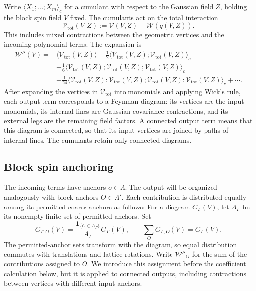 \documentclass[11pt]{article}
\numberwithin{equation}{section}
\theoremstyle{definition}
\theoremstyle{plain}
\begin{document}
Write $\langle X_1;\ldots;X_m\rangle_c$ for a cumulant with
respect to the Gaussian field $Z$, holding the block spin field $V$ fixed.
The cumulants act on the total interaction
\begin{equation}
 \mathcal V_{\mathrm{tot}}(V,Z)
   :=\mathcal V(V,Z)+\mathcal W(q(V,Z)).
 \label{eq:pert-total-interaction}
\end{equation}
This includes mixed contractions between the geometric vertices
and the incoming polynomial terms.  The expansion is
\begin{equation}
 \begin{aligned}
 \mathcal W''(V)
 ={}&\langle\mathcal V_{\mathrm{tot}}(V,Z)\rangle
  -\frac12\langle\mathcal V_{\mathrm{tot}}(V,Z);
                    \mathcal V_{\mathrm{tot}}(V,Z)\rangle_c\\
 &+\frac16\langle\mathcal V_{\mathrm{tot}}(V,Z);
                 \mathcal V_{\mathrm{tot}}(V,Z);
                 \mathcal V_{\mathrm{tot}}(V,Z)\rangle_c\\
 &-\frac1{24}\langle\mathcal V_{\mathrm{tot}}(V,Z);
                    \mathcal V_{\mathrm{tot}}(V,Z);
                    \mathcal V_{\mathrm{tot}}(V,Z);
                    \mathcal V_{\mathrm{tot}}(V,Z)\rangle_c+\cdots.
 \end{aligned}
 \label{eq:pert-cumulants}
\end{equation}
%
After expanding the vertices in $\mathcal V_{\mathrm{tot}}$ into monomials and applying Wick's
rule, each output term corresponds to a Feynman diagram: its
vertices are the input monomials, its internal lines are Gaussian
covariance contractions, and its external legs are the remaining
field factors.  A connected output term means that this diagram
is connected, so that its input vertices are joined by paths of
internal lines.  The cumulants retain only connected diagrams.



\subsection{Block spin anchoring}


The incoming terms have anchors $o\in\Lambda$.
The output will be organized analogously with block anchors $O\in\Lambda'$.
Each contribution is distributed equally among its permitted coarse anchors \cite[Section~3]{OpenAI-O3}
as follows: For a diagram $G_\Gamma(V)$,
let $A_\Gamma$ be its nonempty finite set of permitted anchors.
Set
\begin{equation}
 G_{\Gamma,O}(V)
   =\frac{\mathbf1_{\{O\in A_\Gamma\}}}{|A_\Gamma|}G_\Gamma(V),
 \qquad
 \sum_O G_{\Gamma,O}(V)=G_\Gamma(V).
\end{equation}
The permitted-anchor sets transform with the diagram, so equal
distribution commutes with translations and lattice rotations.
Write $\mathcal W''_O$ for the sum of the contributions assigned
to $O$.  We introduce this assignment before the coefficient
calculation below, but it is applied to connected outputs,
including contractions between vertices with different input anchors.
\end{document}
